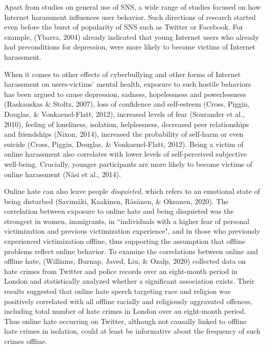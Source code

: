 \documentclass[
  10pt,
  dvipsnames]{scrartcl}
\begin{document}
Apart from studies on general use of SNS, a wide range of studies
focused on how Internet harassment influences user behavior. Such
directions of research started even before the burst of popularity of
SNS such as Twitter or Facebook. For example, (Ybarra, 2004) already
indicated that young Internet users who already had preconditions for
depression, were more likely to become victims of Internet harassment.

When it comes to other effects of cyberbullying and other forms of
Internet harassment on users-victims' mental health, exposure to such
hostile behaviors has been argued to cause depression, sadness,
hopelessness and powerlessness (Raskauskas \& Stoltz, 2007), loss of
confidence and self-esteem (Cross, Piggin, Douglas, \& Vonkaenel-Flatt,
2012), increased levels of fear (Sourander et al., 2010), feeling of
loneliness, isolation, helplessness, decreased peer relationships and
friendships (Nixon, 2014), increased the probability of self-harm or
even suicide (Cross, Piggin, Douglas, \& Vonkaenel-Flatt, 2012). Being a
victim of online harassment also correlates with lower levels of
self-perceived subjective well-being. Crucially, younger participants
are more likely to become victims of online harassment (Näsi et al.,
2014).

Online hate can also leave people \textit{disquieted}, which refers to
an emotional state of being disturbed (Savimäki, Kaakinen, Räsänen, \&
Oksanen, 2020). The correlation between exposure to online hate and
being disquieted was the strongest in women, immigrants, in
``individuals with a higher fear of personal victimization and previous
victimization experience", and in those who previously experienced
victimization offline, thus supporting the assumption that offline
problems reflect online behavior. To examine the correlations between
online and offline hate, (Williams, Burnap, Javed, Liu, \& Ozalp, 2020)
collected data on hate crimes from Twitter and police records over an
eight-month period in London and statistically analyzed whether a
significant association exists. Their results suggested that online hate
speech targeting race and religion was positively correlated with all
offline racially and religiously aggravated offences, including total
number of hate crimes in London over an eight-month period. Thus online
hate occurring on Twitter, although not causally linked to offline hate
crimes in isolation, could at least be informative about the frequency
of such crimes offline.
\end{document}
